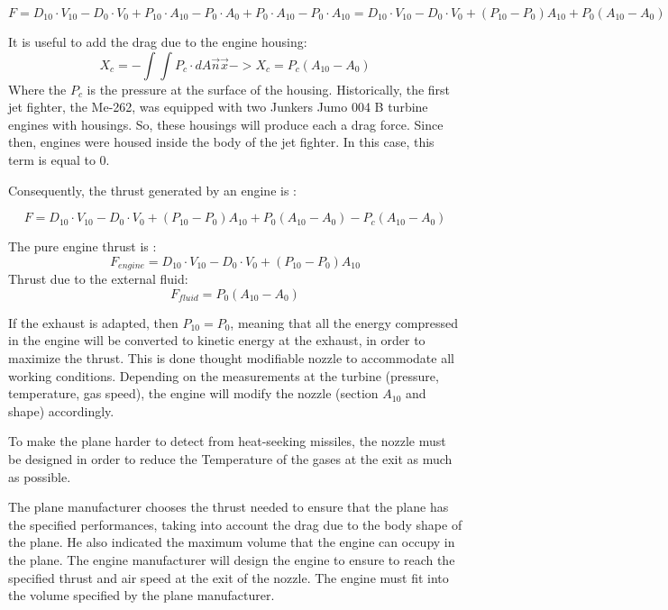 \documentclass[12pt,a4paper]{article}
\begin{document}
	\begin{dmath}
		F = D_{10} \cdot V_{10} - D_{0} \cdot V_{0} + P_{10} \cdot A_{10} - P_{0} \cdot A_0 + P_0 \cdot A_{10} - P_0 \cdot A_{10} = D_{10} \cdot V_{10} - D_{0} \cdot V_{0} + (P_{10} - P_0) A_{10} + P_0 (A_{10} -A_0)
	\end{dmath}
	
	It is useful to add the drag due to the engine housing: 
	\begin{equation}
		X_c = - \int \int P_c \cdot dA \vec{n} \vec{x} -> X_c = P_c (A_{10} - A_0)
	\end{equation}
	Where the $P_c$ is the pressure at the surface of the housing. 
	Historically, the first jet fighter, the Me-262, was equipped with two Junkers Jumo 004 B turbine engines with housings. So, these housings will produce each a drag force. 
	Since then, engines were housed inside the body of the jet fighter. In this case, this term is equal to 0. 
		
	Consequently, the thrust generated by an engine is : 
	
	\begin{dmath}
		F = D_{10} \cdot V_{10} - D_{0} \cdot V_{0} + (P_{10} - P_0) A_{10} + P_0 (A_{10} -A_0) -  P_c (A_{10} - A_0)
	\end{dmath}
	
	The pure engine thrust is : 
	\begin{dmath}
		F_{engine} = D_{10} \cdot V_{10} - D_{0} \cdot V_{0} + (P_{10} - P_0) A_{10}
	\end{dmath}
	Thrust due to the external fluid:  
	\begin{dmath}
		F_{fluid} = P_0 (A_{10} -A_0)
	\end{dmath}
	
	If the exhaust is adapted, then $P_{10} = P_0$, meaning that all the energy compressed in the engine will be converted to kinetic energy at the exhaust, in order to maximize the thrust. This is done thought modifiable nozzle to accommodate all working conditions. Depending on the measurements at the turbine (pressure, temperature, gas speed), the engine will modify the nozzle (section $A_{10}$ and shape) accordingly. 
	
	To make the plane harder to detect from heat-seeking missiles, the nozzle must be designed in order to reduce the Temperature of the gases at the exit as much as possible. 
	
	The plane manufacturer chooses the thrust needed to ensure that the plane has the specified performances, taking into account the drag due to the body shape of the plane. He also indicated the maximum volume that the engine can occupy in the plane.
	The engine manufacturer will design the engine to ensure to reach the specified thrust and air speed at the exit of the nozzle. The engine must fit into the volume specified by the plane manufacturer. 
	
\end{document}
